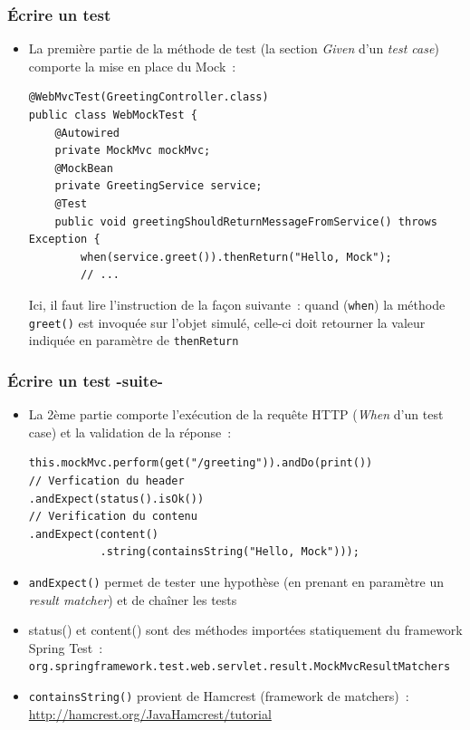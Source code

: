 \documentclass{beamer}
\begin{document}
\begin{frame}[fragile]
	\frametitle{Écrire un test}
	\begin{itemize}

		\item La première partie de la méthode de test (la section \textit{Given} d'un \textit{test case}) comporte la mise en place du Mock~:
\begin{lstlisting}
@WebMvcTest(GreetingController.class)
public class WebMockTest {	
	@Autowired
	private MockMvc mockMvc;
	@MockBean
	private GreetingService service;	
	@Test
	public void greetingShouldReturnMessageFromService() throws Exception {
		when(service.greet()).thenReturn("Hello, Mock");	
		// ...
\end{lstlisting}	
Ici, il faut lire l'instruction de la façon suivante~: quand (\texttt{when}) la méthode \texttt{greet()} est invoquée sur l'objet simulé, celle-ci doit retourner la valeur indiquée en paramètre de \texttt{thenReturn}
		\end{itemize}
\end{frame}

\begin{frame}[fragile]
	\frametitle{Écrire un test -suite-}
	
	\begin{itemize}
		\item La 2ème partie comporte l'exécution de la requête HTTP (\textit{When} d'un test case) et la validation de la réponse~:
\begin{lstlisting}
this.mockMvc.perform(get("/greeting")).andDo(print())
// Verfication du header
.andExpect(status().isOk())
// Verification du contenu
.andExpect(content()
           .string(containsString("Hello, Mock")));		
\end{lstlisting}
\item \texttt{andExpect()} permet de tester une hypothèse (en prenant en paramètre un \textit{result matcher}) et de chaîner les tests
\item status() et content() sont des méthodes importées statiquement du framework Spring Test~:\\
\footnotesize
\texttt{org.springframework.test.web.servlet.result.MockMvcResultMatchers}
\normalsize
\item \texttt{containsString()} provient de Hamcrest (framework de matchers)~:
\footnotesize
\url{http://hamcrest.org/JavaHamcrest/tutorial}
\normalsize
	\end{itemize}
\end{frame}
\end{document}
